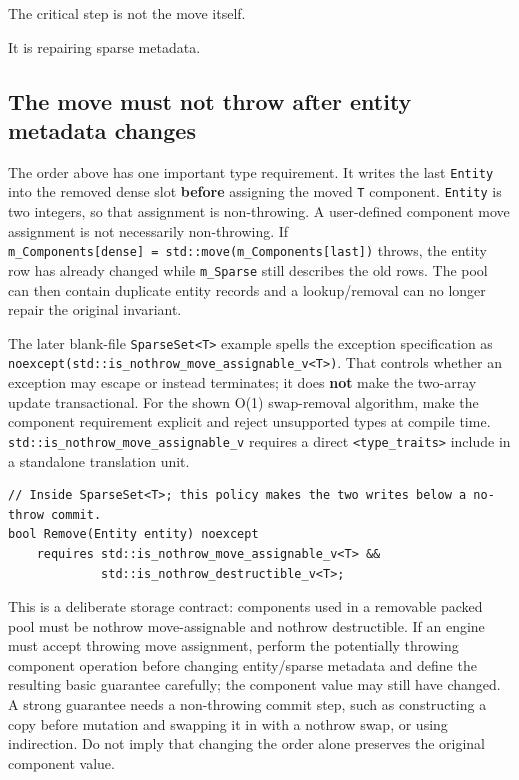 The critical step is not the move itself.

It is repairing sparse metadata.

\subsection{The move must not throw after entity metadata changes}\label{05-engine-i-ch015-the-move-must-not-throw-after-entity-metadata-changes}

The order above has one important type requirement. It writes the last \texttt{Entity} into the removed dense slot \textbf{before} assigning the moved \texttt{T} component. \texttt{Entity} is two integers, so that assignment is non-throwing. A user-defined component move assignment is not necessarily non-throwing. If \texttt{m\_Components{[}dense{]}\ =\ std::move(m\_Components{[}last{]})} throws, the entity row has already changed while \texttt{m\_Sparse} still describes the old rows. The pool can then contain duplicate entity records and a lookup/removal can no longer repair the original invariant.

The later blank-file \texttt{SparseSet\textless{}T\textgreater{}} example spells the exception specification as \texttt{noexcept(std::is\_nothrow\_move\_assignable\_v\textless{}T\textgreater{})}. That controls whether an exception may escape or instead terminates; it does \textbf{not} make the two-array update transactional. For the shown O(1) swap-removal algorithm, make the component requirement explicit and reject unsupported types at compile time. \texttt{std::is\_nothrow\_move\_assignable\_v} requires a direct \texttt{\textless{}type\_traits\textgreater{}} include in a standalone translation unit.

\begin{verbatim}
// Inside SparseSet<T>; this policy makes the two writes below a no-throw commit.
bool Remove(Entity entity) noexcept
    requires std::is_nothrow_move_assignable_v<T> &&
             std::is_nothrow_destructible_v<T>;
\end{verbatim}

This is a deliberate storage contract: components used in a removable packed pool must be nothrow move-assignable and nothrow destructible. If an engine must accept throwing move assignment, perform the potentially throwing component operation before changing entity/sparse metadata and define the resulting basic guarantee carefully; the component value may still have changed. A strong guarantee needs a non-throwing commit step, such as constructing a copy before mutation and swapping it in with a nothrow swap, or using indirection. Do not imply that changing the order alone preserves the original component value.

